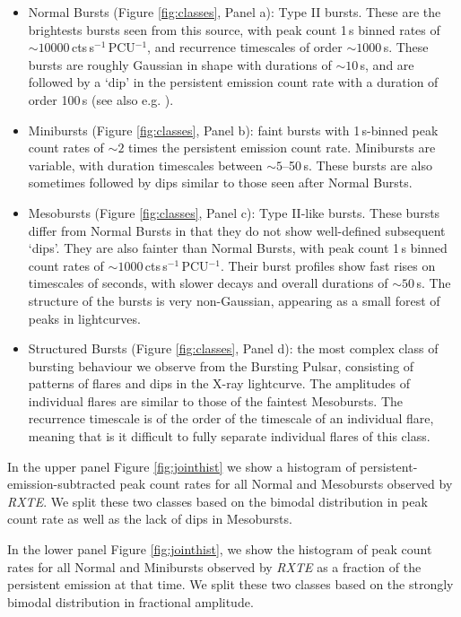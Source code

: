 \begin{itemize}
\item Normal Bursts (Figure \ref{fig:classes}, Panel a): Type II bursts.  These are the brightests bursts seen from this source, with peak count 1\,s binned rates of $\sim10000$\,cts\,s$^{-1}$\,PCU$^{-1}$, and recurrence timescales of order $\sim1000$\,s.  These bursts are roughly Gaussian in shape with durations of $\sim10$\,s, and are followed by a `dip' in the persistent emission count rate with a duration of order 100\,s (see also e.g. \citealp{Giles_BP}).
\item Minibursts (Figure \ref{fig:classes}, Panel b): faint bursts with 1\,s-binned peak count rates of $\sim2$ times the persistent emission count rate.  Minibursts are variable, with duration timescales between $\sim5$--50\,s.  These bursts are also sometimes followed by dips similar to those seen after Normal Bursts.
\item Mesobursts (Figure \ref{fig:classes}, Panel c): Type II-like bursts.  These bursts differ from Normal Bursts in that they do not show well-defined subsequent `dips'.  They are also fainter than Normal Bursts, with peak count 1\,s binned count rates of $\sim1000$\,cts\,s$^{-1}$\,PCU$^{-1}$.  Their burst profiles show fast rises on timescales of seconds, with slower decays and overall durations of $\sim50$\,s.  The structure of the bursts is very non-Gaussian, appearing as a small forest of peaks in lightcurves.
\item Structured Bursts (Figure \ref{fig:classes}, Panel d): the most complex class of bursting behaviour we observe from the Bursting Pulsar, consisting of patterns of flares and dips in the X-ray lightcurve.  The amplitudes of individual flares are similar to those of the faintest Mesobursts.  The recurrence timescale is of the order of the timescale of an individual flare, meaning that is it difficult to fully separate individual flares of this class.
\end{itemize}

\par In the upper panel Figure \ref{fig:jointhist} we show a histogram of persistent-emission-subtracted peak count rates for all Normal and Mesobursts observed by \textit{RXTE}.  We split these two classes based on the bimodal distribution in peak count rate as well as the lack of dips in Mesobursts.
\par In the lower panel Figure \ref{fig:jointhist}, we show the histogram of peak count rates for all Normal and Minibursts observed by \textit{RXTE} as a fraction of the persistent emission at that time.  We split these two classes based on the strongly bimodal distribution in fractional amplitude.

